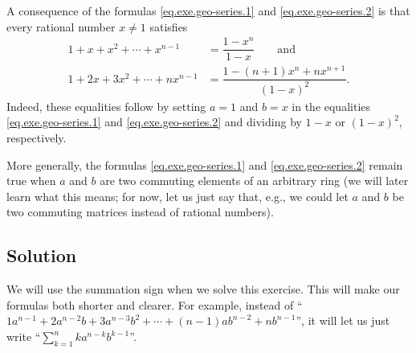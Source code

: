 \documentclass[paper=a4, fontsize=12pt]{scrartcl} %
\newcommand{\tup}[1]{\left( #1 \right)}
\let\sumnonlimits\sum
\renewcommand{\sum}{\sumnonlimits\limits}
\theoremstyle{plainsl}
\theoremstyle{definition}
\theoremstyle{remark}
\begin{document}
A consequence of the formulas
\eqref{eq.exe.geo-series.1} and \eqref{eq.exe.geo-series.2}
is that every rational number $x \neq 1$ satisfies
\begin{align*}
1 + x + x^2 + \cdots + x^{n-1} &= \dfrac{1 - x^n}{1 - x}
\qquad
\text{and} \\
1 + 2 x + 3 x^2 + \cdots + n x^{n-1}
&= \dfrac{1 - \tup{n+1} x^n + n x^{n+1}}{\tup{1 - x}^2} .
\end{align*}
Indeed, these equalities follow by setting $a = 1$ and $b = x$
in the equalities
\eqref{eq.exe.geo-series.1} and \eqref{eq.exe.geo-series.2}
and dividing by $1-x$ or $\tup{1-x}^2$, respectively.

More generally, the formulas
\eqref{eq.exe.geo-series.1} and \eqref{eq.exe.geo-series.2}
remain true when $a$ and $b$ are two commuting elements of an
arbitrary ring
(we will later learn what this means; for now, let us
just say that, e.g., we could let $a$ and $b$ be two commuting
matrices instead of rational numbers).

\subsection{Solution}

We will use the summation sign when we solve this exercise.
This will make our formulas both shorter and clearer.
For example, instead of
``$1 a^{n-1} + 2 a^{n-2} b + 3 a^{n-3} b^2 + \cdots + \tup{n-1} a b^{n-2} + n b^{n-1}$'',
it will let us just write
``$\sum_{k=1}^n k a^{n-k} b^{k-1}$''.
\end{document}
